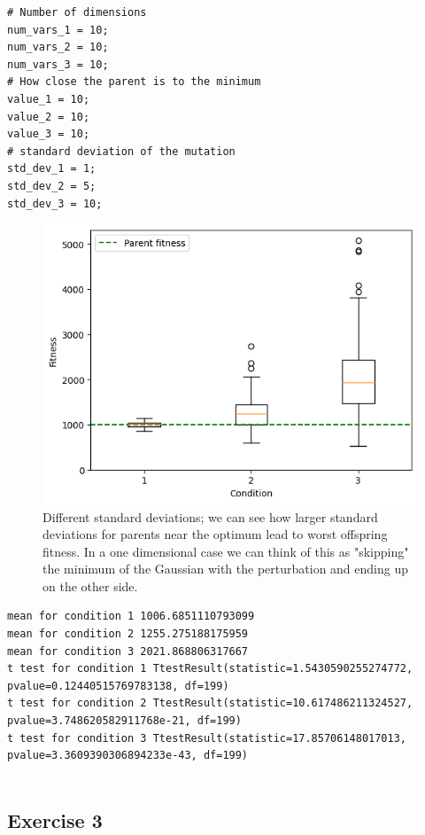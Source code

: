 \begin{lstlisting}
# Number of dimensions
num_vars_1 = 10;
num_vars_2 = 10;
num_vars_3 = 10;
# How close the parent is to the minimum
value_1 = 10;
value_2 = 10;
value_3 = 10;
# standard deviation of the mutation
std_dev_1 = 1;
std_dev_2 = 5;
std_dev_3 = 10;
\end{lstlisting}
\begin{figure}[H]
    \centering
    \includegraphics[width=\linewidth]{images/lab1/diff_var_close_to_optim.png}
    \caption{Different standard deviations; we can see how larger standard deviations for parents near the optimum lead to worst offspring fitness. In a one dimensional case we can think of this as "skipping" the minimum of the Gaussian with the perturbation and ending up on the other side.}
\end{figure}
\begin{lstlisting}
mean for condition 1 1006.6851110793099
mean for condition 2 1255.275188175959
mean for condition 3 2021.868806317667
t test for condition 1 TtestResult(statistic=1.5430590255274772, pvalue=0.12440515769783138, df=199)
t test for condition 2 TtestResult(statistic=10.617486211324527, pvalue=3.748620582911768e-21, df=199)
t test for condition 3 TtestResult(statistic=17.85706148017013, pvalue=3.3609390306894233e-43, df=199)
 
\end{lstlisting}

\subsection{Exercise 3}
